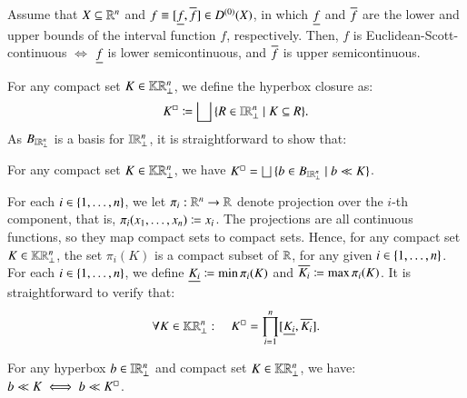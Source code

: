 \documentclass[11pt,times]{article}
\begin{document}
\begin{proposition}
    \label{prop:Euclidean_Scott_Cont}
    Assume that $X \subseteq \R^n$ and
    $f \equiv [\lep[f], \uep[f]] \in D^{(0)}(X)$, in which $\lep[f]$
    and $\uep[f]$ are the lower and upper bounds of the interval
    function $f$, respectively. Then, $f$ is
    Euclidean-Scott-continuous $\iff$ $\lep[f]$ is lower
    semicontinuous, and $\uep[f]$ is upper semicontinuous.
  \end{proposition}

 
For any compact set $K \in \kCPPO{\R^n\lift}$, we define the hyperbox
closure as:
  \begin{equation}
    \label{eq:hyper_rect_clos}
    \hbClos{K} \defeq \lub{\setbarNormal{R \in
        \intvaldom[\R^n\lift]}{K \subseteq R}}. 
  \end{equation}
  As $B_{\intvaldom[\R^n\lift]}$ is a basis for
  $\intvaldom[\R^n\lift]$, it is straightforward to show that:
  \begin{proposition}
    \label{prop:K_box_basis_formulation}
    For any compact set $K \in \kCPPO{\R^n\lift}$, we have
    $\hbClos{K} =   \lub{\setbarNormal{b \in
        B_{\intvaldom[\R^n\lift]}}{ b \ll K}}$.
  \end{proposition}


   
  For each $i \in \set{1, \ldots, n}$, we let $\pi_i: \R^n \to \R$
  denote projection over the $i$-th component, that is,
  $\pi_i( x_1, \ldots, x_n) \defeq x_i$. The projections are all
  continuous functions, so they map compact sets to compact
  sets. Hence, for any compact set $K \in \kCPPO{\R^n\lift}$, the set
  $\pi_i(K)$ is a compact subset of $\R$, for any given
  $i \in \set{1, \ldots, n}$. For each $i \in \set{1, \ldots, n}$, we
  define $\lep[K_i] \defeq \min \pi_i(K)$ and
  $\uep[K_i] \defeq \max \pi_i(K)$. It is straightforward to verify
  that:
  \begin{equation}
    \label{eq:K_box_prod}
    \forall K \in \kCPPO{\R^n\lift}: \quad \hbClos{K} = \prod_{i=1}^n
    [\lep[K_i], \uep[K_i]].
  \end{equation}


  \begin{lemma}
    \label{lemma:b_waybelow_K_box}
    For any hyperbox $b \in \intvaldom[\R^n\lift]$ and compact set
    $K \in \kCPPO{\R^n\lift}$, we have: $b \ll K \iff b \ll \hbClos{K}$.
  \end{lemma}
\end{document}
